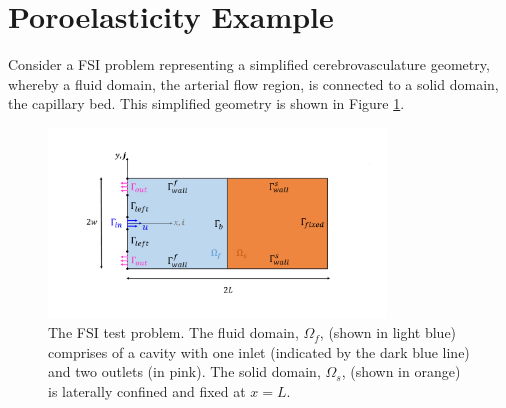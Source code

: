 \documentclass[oneside,11pt,times]{book}
\begin{document}
\section{Poroelasticity Example}
Consider a FSI problem representing a simplified cerebrovasculature geometry, whereby a fluid domain, the arterial flow region,
is connected to a solid domain, the capillary bed. This simplified geometry is shown in Figure \ref{fig:FSI_scheme}.
\begin{figure}[h]
\centering
\includegraphics[width=0.8\textwidth,trim={2cm 2cm 3cm 2cm}, clip]{imgs/FSI_scheme.pdf}
\caption{The FSI test problem. The fluid domain, $\Omega_f$, (shown in light blue) comprises of a cavity with one inlet (indicated by the dark blue line) and two outlets (in pink). The solid domain, $\Omega_s$, (shown in orange) is laterally confined and fixed at $x = L$.}
\label{fig:FSI_scheme}
\end{figure}
\end{document}
